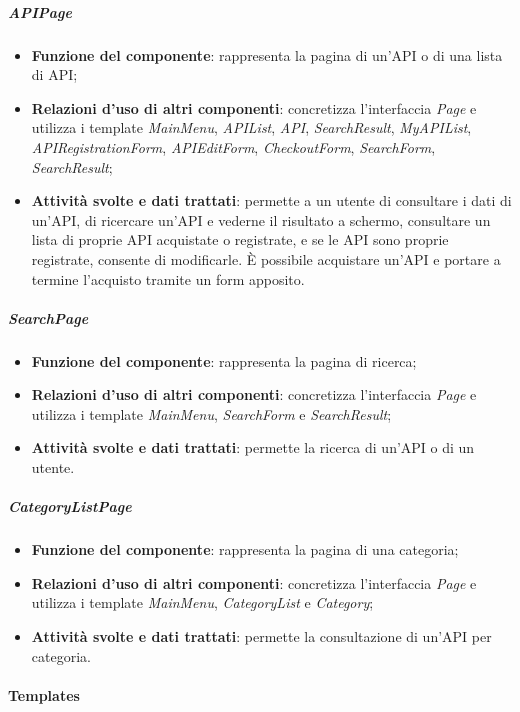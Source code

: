 \subparagraph{APIPage}
\begin{itemize}
	\item \textbf{Funzione del componente}: rappresenta la pagina di un'API o di una lista di API;
	\item \textbf{Relazioni d’uso di altri componenti}: concretizza l'interfaccia \textit{Page} e utilizza i template \textit{MainMenu}, \textit{APIList}, \textit{API}, \textit{SearchResult}, \textit{MyAPIList}, \textit{APIRegistrationForm}, \textit{APIEditForm}, \textit{CheckoutForm}, \textit{SearchForm}, \textit{SearchResult};
	\item \textbf{Attività svolte e dati trattati}: permette a un utente di consultare i dati di un'API, di ricercare un'API e vederne il risultato a schermo, consultare un lista di proprie API acquistate o registrate, e se le API sono proprie registrate, consente di modificarle. \MakeUppercase{è} possibile acquistare un'API e portare a termine l'acquisto tramite un form apposito.
\end{itemize}

\subparagraph{SearchPage}
\begin{itemize}
	\item \textbf{Funzione del componente}: rappresenta la pagina di ricerca;
	\item \textbf{Relazioni d’uso di altri componenti}: concretizza l'interfaccia \textit{Page} e utilizza i template \textit{MainMenu}, \textit{SearchForm} e \textit{SearchResult};
	\item \textbf{Attività svolte e dati trattati}: permette la ricerca di un'API o di un utente.	
\end{itemize}

\subparagraph{CategoryListPage}
\begin{itemize}
	\item \textbf{Funzione del componente}: rappresenta la pagina di una categoria;
	\item \textbf{Relazioni d’uso di altri componenti}: concretizza l'interfaccia \textit{Page} e utilizza i template \textit{MainMenu}, \textit{CategoryList} e \textit{Category};
	\item \textbf{Attività svolte e dati trattati}: permette la consultazione di un'API per categoria.
\end{itemize}


\paragraph{Templates}

